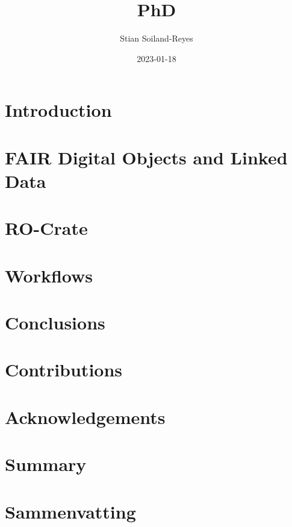 \documentclass[british,a4paper]{book}
\title{PhD}
\author{Stian Soiland-Reyes}
\date{2023-01-18}
\begin{document}
\maketitle
\tableofcontents

\chapter{Introduction}

\chapter{FAIR Digital Objects and Linked Data}


\chapter{RO-Crate}



\chapter{Workflows}




\chapter{Conclusions}


\chapter{Contributions}

\chapter{Acknowledgements}




\chapter{Summary}

\chapter{Sammenvatting}

\end{document}
